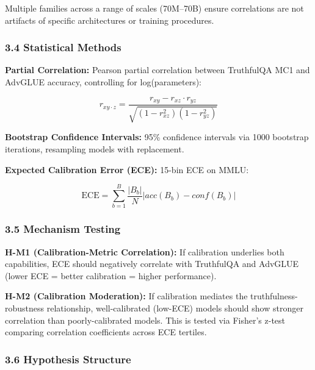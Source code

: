 Multiple families across a range of scales (70M--70B) ensure correlations are not artifacts of specific architectures or training procedures.

\subsubsection{3.4 Statistical Methods}

\textbf{Partial Correlation:} Pearson partial correlation between TruthfulQA MC1 and AdvGLUE accuracy, controlling for log(parameters):

$$r_{xy \cdot z} = \frac{r_{xy} - r_{xz} \cdot r_{yz}}{\sqrt{(1 - r_{xz}^2)(1 - r_{yz}^2)}}$$

\textbf{Bootstrap Confidence Intervals:} 95\% confidence intervals via 1000 bootstrap iterations, resampling models with replacement.

\textbf{Expected Calibration Error (ECE):} 15-bin ECE on MMLU:

$$\text{ECE} = \sum_{b=1}^{B} \frac{|B_b|}{N} |acc(B_b) - conf(B_b)|$$

\subsubsection{3.5 Mechanism Testing}

\textbf{H-M1 (Calibration-Metric Correlation):} If calibration underlies both capabilities, ECE should negatively correlate with TruthfulQA and AdvGLUE (lower ECE = better calibration = higher performance).

\textbf{H-M2 (Calibration Moderation):} If calibration mediates the truthfulness-robustness relationship, well-calibrated (low-ECE) models should show stronger correlation than poorly-calibrated models. This is tested via Fisher's z-test comparing correlation coefficients across ECE tertiles.

\subsubsection{3.6 Hypothesis Structure}

\begin{table}[htbp]
\centering
{}
\end{table}
